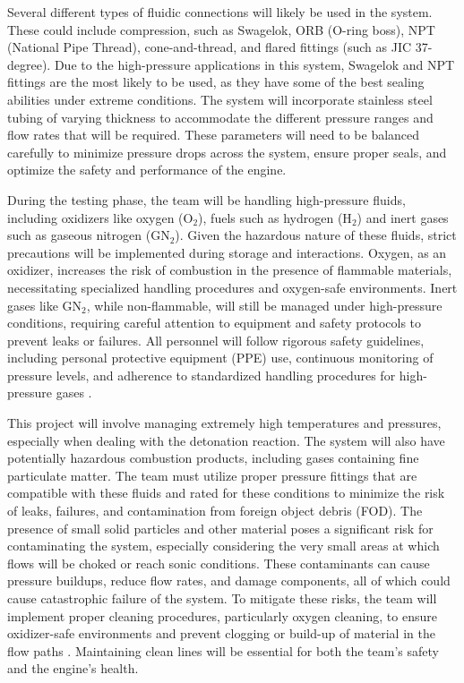 Several different types of fluidic connections will likely be used in the system. These could include compression, such as Swagelok, ORB (O-ring boss), NPT (National Pipe Thread), cone-and-thread, and flared fittings (such as JIC 37-degree). Due to the high-pressure applications in this system, Swagelok and NPT fittings are the most likely to be used, as they have some of the best sealing abilities under extreme conditions. The system will incorporate stainless steel tubing of varying thickness to accommodate the different pressure ranges and flow rates that will be required. These parameters will need to be balanced carefully to minimize pressure drops across the system, ensure proper seals, and optimize the safety and performance of the engine.

During the testing phase, the team will be handling high-pressure fluids, including oxidizers like oxygen (O$_2$), fuels such as hydrogen (H$_2$) and inert gases such as gaseous nitrogen (GN$_2$). Given the hazardous nature of these fluids, strict precautions will be implemented during storage and interactions. Oxygen, as an oxidizer, increases the risk of combustion in the presence of flammable materials, necessitating specialized handling procedures and oxygen-safe environments. Inert gases like GN$_2$, while non-flammable, will still be managed under high-pressure conditions, requiring careful attention to equipment and safety protocols to prevent leaks or failures. All personnel will follow rigorous safety guidelines, including personal protective equipment (PPE) use, continuous monitoring of pressure levels, and adherence to standardized handling procedures for high-pressure gases \cite{aiga-hydrogen-supply:2024, aiga-oxygen-cleaning:2019, nasa-oxygen-systems:1996}.

This project will involve managing extremely high temperatures and pressures, especially when dealing with the detonation reaction. The system will also have potentially hazardous combustion products, including gases containing fine particulate matter. The team must utilize proper pressure fittings that are compatible with these fluids and rated for these conditions to minimize the risk of leaks, failures, and contamination from foreign object debris (FOD). The presence of small solid particles and other material poses a significant risk for contaminating the system, especially considering the very small areas at which flows will be choked or reach sonic conditions. These contaminants can cause pressure buildups, reduce flow rates, and damage components, all of which could cause catastrophic failure of the system. To mitigate these risks, the team will implement proper cleaning procedures, particularly oxygen cleaning, to ensure oxidizer-safe environments and prevent clogging or build-up of material in the flow paths \cite{aiga-oxygen-cleaning:2019}. Maintaining clean lines will be essential for both the team’s safety and the engine's health.


